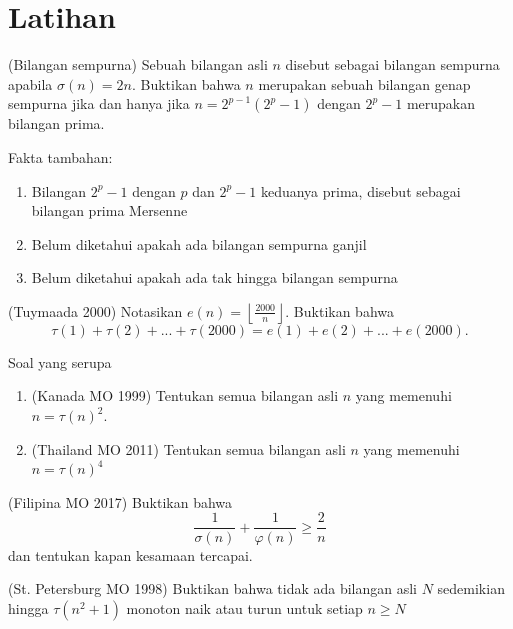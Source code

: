\documentclass[11pt]{scrartcl}
\begin{document}
\section{Latihan}
\begin{problem}
    (Bilangan sempurna) Sebuah bilangan asli $n$ disebut sebagai bilangan sempurna apabila $\sigma(n) = 2n$. Buktikan bahwa $n$ merupakan sebuah bilangan genap sempurna jika dan hanya jika $n = 2^{p - 1}(2^p - 1)$ dengan $2^p - 1$ merupakan bilangan prima.

    Fakta tambahan:
    \begin{enumerate}
        \item Bilangan $2^p - 1$ dengan $p$ dan $2^p - 1$ keduanya prima, disebut sebagai bilangan prima Mersenne
        \item Belum diketahui apakah ada bilangan sempurna ganjil
        \item Belum diketahui apakah ada tak hingga bilangan sempurna
    \end{enumerate}
\end{problem}

\begin{problem}
    (Tuymaada 2000) Notasikan $e(n) = \left\lfloor \frac{2000}{n} \right\rfloor$. Buktikan bahwa $$\tau(1) + \tau(2) + ...+\tau(2000) = e(1) + e(2) + ... + e(2000).$$
\end{problem}

\begin{problem}
Soal yang serupa
\begin{enumerate}
    \item (Kanada MO 1999) Tentukan semua bilangan asli $n$ yang memenuhi $n = \tau(n)^2$.
    \item (Thailand MO 2011) Tentukan semua bilangan asli $n$ yang memenuhi $n = \tau(n)^4$
\end{enumerate}
\end{problem}

\begin{problem}
    (Filipina MO 2017) Buktikan bahwa $$\dfrac{1}{\sigma(n)} + \dfrac{1}{\varphi(n)} \geq \dfrac{2}{n}$$ dan tentukan kapan kesamaan tercapai.
\end{problem}

\begin{problem}
    (St. Petersburg MO 1998) Buktikan bahwa tidak ada bilangan asli $N$ sedemikian hingga $\tau(n^2 + 1)$ monoton naik atau turun untuk setiap $n \geq N$
\end{problem}
\end{document}
